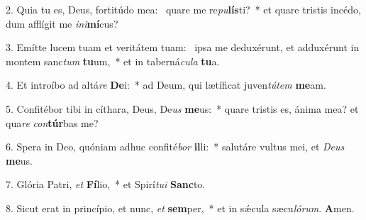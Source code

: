 2. Quia tu es, Deus, fortitúdo mea: \dag\  quare me re\textit{pu}\textbf{lís}ti?~*  et quare tristis incédo, dum afflígit me \textit{in}\textit{i}\textbf{mí}cus?\

3. Emítte lucem tuam et veritátem tuam: \dag\  ipsa me deduxérunt, et adduxérunt in montem sanc\textit{tum} \textbf{tu}um,~*  et in taberná\textit{cu}\textit{la} \textbf{tu}a.\

4. Et introíbo ad altá\textit{re} \textbf{De}i:~*  ad Deum, qui lætíficat juven\textit{tú}\textit{tem} \textbf{me}am.\

5. Confitébor tibi in cíthara, Deus, De\textit{us} \textbf{me}us:~*  quare tristis es, ánima mea? et qua\textit{re} \textit{con}\textbf{túr}bas me?\

6. Spera in Deo, quóniam adhuc confité\textit{bor} \textbf{il}li:~*  salutáre vultus mei, et \textit{De}\textit{us} \textbf{me}us.\

7. Glória Patri, \textit{et} \textbf{Fí}lio,~*  et Spirí\textit{tu}\textit{i} \textbf{Sanc}to.\

8. Sicut erat in princípio, et nunc, \textit{et} \textbf{sem}per,~*  et in sǽcula sæcu\textit{ló}\textit{rum}. \textbf{A}men.\

